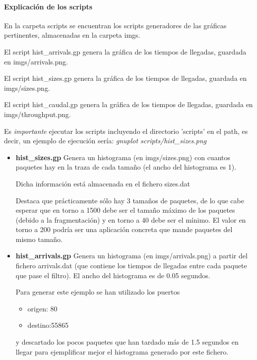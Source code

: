 \documentclass[nochap]{apuntes}
\begin{document}
\paragraph{Explicación de los scripts}

En la carpeta scripts se encuentran los scripts generadores de las gráficas pertinentes, almacenadas en la carpeta imgs.

El script hist\_arrivals.gp genera la gráfica de los tiempos de llegadas, guardada en imgs/arrivals.png.

El script hist\_sizes.gp genera la gráfica de los tiempos de llegadas, guardada en imgs/sizes.png.

El script hist\_caudal.gp genera la gráfica de los tiempos de llegadas, guardada en imgs/throughput.png.

Es \emph{importante} ejecutar los scripts incluyendo el directorio 'scripts' en el path, es decir, un ejemplo de ejecución sería: \emph{gnuplot scripts/hist\_sizes.png}
\begin{itemize}
	\item \textbf{hist\_sizes.gp} Genera un histograma (en imgs/sizes.png) con cuantos paquetes hay en la traza de cada tamaño (el ancho del histograma es 1). 

	Dicha información está almacenada en el fichero sizes.dat

	Destaca que prácticamente sólo hay 3 tamaños de paquetes, de lo que cabe esperar que en torno a 1500 debe ser el tamaño máximo de los paquetes (debido a la fragmentación) y en torno a 40 debe ser el mínimo. El valor en torno a 200 podría ser una aplicación concreta que mande paquetes del mismo tamaño.
	

	\item \textbf{hist\_arrivals.gp} Genera un histograma (en imgs/arrivals.png) a partir del fichero arrivals.dat (que contiene los tiempos de llegadas entre cada paquete que pase el filtro). El ancho del histograma es de 0.05 segundos.

	Para generar este ejemplo se han utilizado los puertos 

	\begin{itemize}
		\item origen: 80
		\item destino:55865
	\end{itemize}
	y descartado los pocos paquetes que han tardado más de 1.5 segundos en llegar para ejemplificar mejor el histograma generado por este fichero.
	
\end{itemize}
\end{document}
